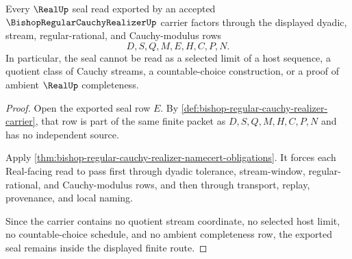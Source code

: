 \begin{theorem}
\label{thm:bishop-regular-cauchy-realizer-seal-nonescape}
Every $\RealUp$ seal read exported by an accepted $\BishopRegularCauchyRealizerUp$ carrier factors through the displayed dyadic, stream, regular-rational, and Cauchy-modulus rows
$$
D,S,Q,M,E,H,C,P,N .
$$
In particular, the seal cannot be read as a selected limit of a host sequence, a quotient class of Cauchy streams, a countable-choice construction, or a proof of ambient $\RealUp$ completeness.
\end{theorem}
\begin{proof}
Open the exported seal row $E$. By \autoref{def:bishop-regular-cauchy-realizer-carrier}, that row is part of the same finite packet as $D,S,Q,M,H,C,P,N$ and has no independent source.

Apply \autoref{thm:bishop-regular-cauchy-realizer-namecert-obligations}. It forces each Real-facing read to pass first through dyadic tolerance, stream-window, regular-rational, and Cauchy-modulus rows, and then through transport, replay, provenance, and local naming.

Since the carrier contains no quotient stream coordinate, no selected host limit, no countable-choice schedule, and no ambient completeness row, the exported seal remains inside the displayed finite route.
\end{proof}


\begin{closurestatus}{\BishopRegularCauchyRealizerUp}
  \theoryclosure{\seedClosure}
  \formalstatus{\unformalizedV}
\end{closurestatus}
